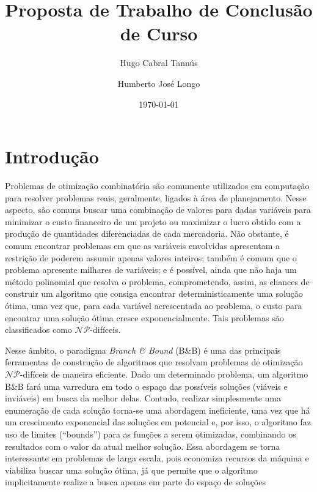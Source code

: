 \documentclass[a4paper,10pt]{article}
\newcommand{\fw}[1]{\emph{#1}}
\begin{document}
\author{Hugo Cabral Tannús \and Humberto José Longo}
\title{Proposta de Trabalho de Conclusão de Curso}
\date{\today}
\maketitle

\section{Introdu\c{c}\~{a}o}
\label{sec:intro}
Problemas de otimização combinatória são comumente utilizados em computação para
resolver problemas reais, geralmente, ligados à área de planejamento. Nesse
aspecto, são comuns buscar uma combinação de valores para dadas variáveis para
minimizar o custo financeiro de um projeto ou maximizar o lucro obtido com a
produção de quantidades diferenciadas de cada mercadoria. Não obstante, é comum
encontrar problemas em que as variáveis envolvidas apresentam a restrição de 
poderem assumir apenas valores inteiros; também é comum que o problema
apresente milhares de variáveis; e é possível, ainda que não haja um método
polinomial que resolva o problema, comprometendo, assim, as chances de construir
um algoritmo que consiga encontrar deterministicamente uma solução ótima, uma
vez que, para cada variável acrescentada ao problema, o custo para encontrar uma
solução ótima cresce exponencialmente. Tais problemas são classificados como
$\mathcal{NP}$-difíceis.

Nesse âmbito, o paradigma \fw{Branch \& Bound} (B\&B) é uma das principais 
ferramentas de construção de algoritmos que resolvam problemas de otimização
$\mathcal{NP}$-difíceis de maneira eficiente. Dado um determinado problema,
um algoritmo B\&B fará uma varredura em todo o espaço das possíveis soluções
(viáveis e inviáveis) em busca da melhor delas. Contudo, realizar simplesmente
uma enumeração de cada solução torna-se uma abordagem ineficiente, uma vez que
há um crescimento exponencial das soluções em potencial e, por isso, o algoritmo 
faz uso de
limites (``bounds'') para as funções a serem otimizadas, combinando os
resultados com o valor
da atual melhor solução. Essa abordagem se torna interessante em problemas de
larga escala, pois economiza recursos da máquina e viabiliza buscar uma solução
ótima, já que permite que o
algoritmo implicitamente realize a busca apenas em parte do espaço de soluções
\end{document}

